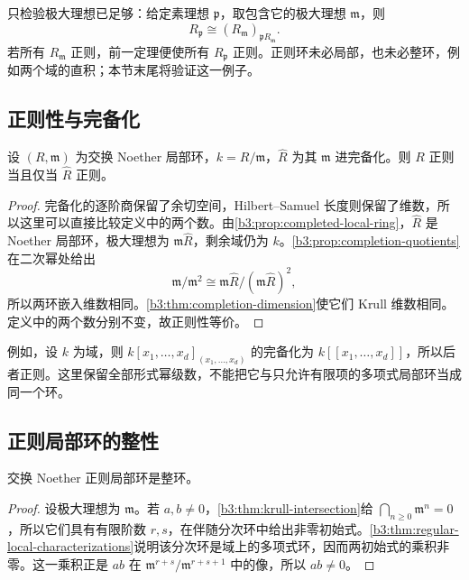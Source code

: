 只检验极大理想已足够：给定素理想 \(\mathfrak p\)，取包含它的极大理想 \(\mathfrak m\)，则
\[
	R_{\mathfrak p}\cong(R_{\mathfrak m})_{\mathfrak pR_{\mathfrak m}}.
\]
若所有 \(R_{\mathfrak m}\) 正则，前一定理便使所有 \(R_{\mathfrak p}\) 正则。正则环未必局部，也未必整环，例如两个域的直积；本节末尾将验证这一例子。

\subsection{正则性与完备化}
\label{b3:subsec:1803:02}

\begin{theorem}\label{b3:thm:regular-local-completion}
	设 \((R,\mathfrak m)\) 为交换 Noether 局部环，\(k=R/\mathfrak m\)，\(\widehat R\) 为其 \(\mathfrak m\) 进完备化。则 \(R\) 正则当且仅当 \(\widehat R\) 正则。
\end{theorem}
\begin{proof}
	完备化的逐阶商保留了余切空间，Hilbert–Samuel 长度则保留了维数，所以这里可以直接比较定义中的两个数。由\cref{b3:prop:completed-local-ring}，\(\widehat R\) 是 Noether 局部环，极大理想为 \(\mathfrak m\widehat R\)，剩余域仍为 \(k\)。\cref{b3:prop:completion-quotients}在二次幂处给出
	\[
		\mathfrak m/\mathfrak m^2 \cong\mathfrak m\widehat R/(\mathfrak m\widehat R)^2,
	\]
	所以两环嵌入维数相同。\cref{b3:thm:completion-dimension}使它们 Krull 维数相同。定义中的两个数分别不变，故正则性等价。
\end{proof}

例如，设 \(k\) 为域，则 \(k[x_1,\ldots,x_d]_{(x_1,\ldots,x_d)}\) 的完备化为 \(k[\![x_1,\ldots,x_d]\!]\)，所以后者正则。这里保留全部形式幂级数，不能把它与只允许有限项的多项式局部环当成同一个环。

\subsection{正则局部环的整性}
\label{b3:subsec:1803:03}

\begin{proposition}\label{b3:prop:regular-local-domain}
	交换 Noether 正则局部环是整环。
\end{proposition}
\begin{proof}
	设极大理想为 \(\mathfrak m\)。若 \(a,b\ne0\)，\cref{b3:thm:krull-intersection}给 \(\bigcap_{n\ge0}\mathfrak m^n=0\)，所以它们具有有限阶数 \(r,s\)，在伴随分次环中给出非零初始式。\cref{b3:thm:regular-local-characterizations}说明该分次环是域上的多项式环，因而两初始式的乘积非零。这一乘积正是 \(ab\) 在 \(\mathfrak m^{r+s}/\mathfrak m^{r+s+1}\) 中的像，所以 \(ab\ne0\)。
\end{proof}

